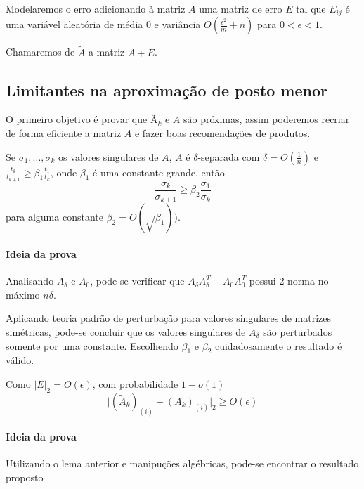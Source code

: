 \documentclass[a4paper,10pt]{article}
\begin{document}
 Modelaremos o erro adicionando à matriz $A$ uma matriz de erro $E$ tal
que $E_{ij}$ é uma variável aleatória de média 0 e variância 
$O(\frac{\epsilon^2}{m} + n )$ para $0 < \epsilon < 1$.

Chamaremos de $\tilde A$ a matriz $ A + E $.

\subsection{Limitantes na aproximação de posto menor}

O primeiro objetivo é provar que Ã$_k$ e $A$ são próximas, assim poderemos
recriar de forma eficiente a matriz $A$ e fazer boas recomendações de 
produtos. 

\begin{lema}
 Se $\sigma_1, ..., \sigma_k$ os valores singulares de $A$, $A$ é $\delta$-separada com $\delta = O(\frac{1}{n})$ e $\frac{t_k}{t_{k+1}} \geq \beta_1 \frac{t_1}{t_k}$, onde $\beta_1$ é uma constante grande, então 
\begin{equation}
\frac{\sigma_k}{\sigma_{k+1}} \geq \beta_2 \frac{\sigma_1}{\sigma_{k}}
\end{equation}
para alguma constante $\beta_2 = O (\sqrt{\beta_1}))$.

\end{lema}
\paragraph{Ideia da prova\\}
Analisando $A_\delta$ e $A_0$, pode-se verificar que $A_\delta A_\delta^T - A_0 A_0^T$ possui 2-norma no máximo $n \delta$.

Aplicando teoria padrão de perturbação para valores singulares de matrizes simétricas, pode-se concluir que os valores singulares de $A_\delta$ são perturbados somente por uma constante. Escolhendo $\beta_1$ e $\beta_2$ cuidadosamente o resultado é válido. 

\begin{lema} 
Como $\vert E \vert_2 = O(\epsilon)$, com probabilidade  $ 1 - o(1) $
\begin{equation}
\vert (\tilde A_k)_{(i)} - (A_k)_{(i)}\vert_2 \geq O(\epsilon)
\end{equation}
\end{lema}

\paragraph{Ideia da prova \\}
Utilizando o lema anterior e manipuções algébricas, pode-se
encontrar o resultado proposto
\end{document}
